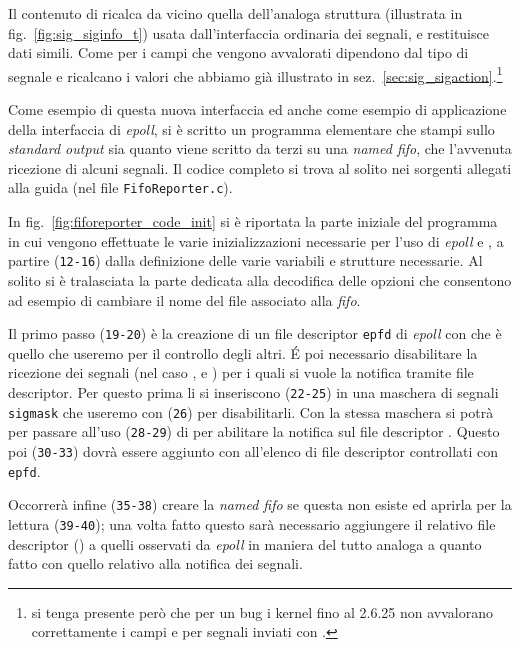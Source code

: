 Il contenuto di  ricalca da vicino quella
dell'analoga struttura  (illustrata in
fig.~\ref{fig:sig_siginfo_t}) usata dall'interfaccia ordinaria dei segnali, e
restituisce dati simili. Come per  i campi che vengono
avvalorati dipendono dal tipo di segnale e ricalcano i valori che abbiamo già
illustrato in sez.~\ref{sec:sig_sigaction}.\footnote{si tenga presente però
  che per un bug i kernel fino al 2.6.25 non avvalorano correttamente i campi
   e  per segnali inviati con .}

Come esempio di questa nuova interfaccia ed anche come esempio di applicazione
della interfaccia di \textit{epoll}, si è scritto un programma elementare che
stampi sullo \textit{standard output} sia quanto viene scritto da terzi su una
\textit{named fifo}, che l'avvenuta ricezione di alcuni segnali.  Il codice
completo si trova al solito nei sorgenti allegati alla guida (nel file
\texttt{FifoReporter.c}).

In fig.~\ref{fig:fiforeporter_code_init} si è riportata la parte iniziale del
programma in cui vengono effettuate le varie inizializzazioni necessarie per
l'uso di \textit{epoll} e , a partire (\texttt{\small 12-16})
dalla definizione delle varie variabili e strutture necessarie. Al solito si è
tralasciata la parte dedicata alla decodifica delle opzioni che consentono ad
esempio di cambiare il nome del file associato alla \textit{fifo}.

Il primo passo (\texttt{\small 19-20}) è la creazione di un file descriptor
\texttt{epfd} di \textit{epoll} con  che è quello che
useremo per il controllo degli altri.  É poi necessario disabilitare la
ricezione dei segnali (nel caso ,  e
) per i quali si vuole la notifica tramite file
descriptor. Per questo prima li si inseriscono (\texttt{\small 22-25}) in una
maschera di segnali \texttt{sigmask} che useremo con (\texttt{\small 26})
 per disabilitarli.  Con la stessa maschera si potrà per
passare all'uso (\texttt{\small 28-29}) di  per abilitare la
notifica sul file descriptor . Questo poi (\texttt{\small 30-33})
dovrà essere aggiunto con  all'elenco di file descriptor
controllati con \texttt{epfd}.

Occorrerà infine (\texttt{\small 35-38}) creare la \textit{named fifo} se
questa non esiste ed aprirla per la lettura (\texttt{\small 39-40}); una volta
fatto questo sarà necessario aggiungere il relativo file descriptor
() a quelli osservati da \textit{epoll} in maniera del tutto
analoga a quanto fatto con quello relativo alla notifica dei segnali.

